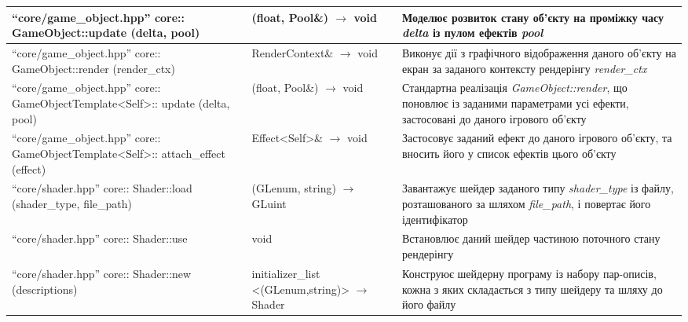 \begin{longtable}{| C{6cm} | C{4cm} | C{5cm} |}
  \hline
  ``core/game_object.hpp'' \newline core:: \newline
  GameObject::update \newline (delta, pool)
  & (float, Pool\&) $\to$ void
  & Моделює розвиток стану об'єкту на проміжку часу
  \emph{delta} із пулом ефектів \emph{pool} \\
  \hline
  ``core/game_object.hpp'' \newline core:: \newline
  GameObject::render \newline (render_ctx)
  & RenderContext\& $\to$ void
  & Виконує дії з графічного відображення даного об'єкту на екран
  за заданого контексту рендерінгу \emph{render_ctx} \\
  \hline
  ``core/game_object.hpp'' \newline core:: \newline
  GameObjectTemplate<Self>:: \newline update \newline (delta, pool)
  & (float, Pool\&) $\to$ void
  & Стандартна реалізація \emph{GameObject::render},
  що поновлює із заданими параметрами усі ефекти,
  застосовані до даного ігрового об'єкту \\
  \hline
  ``core/game_object.hpp'' \newline core:: \newline
  GameObjectTemplate<Self>:: \newline attach_effect \newline (effect)
  & Effect<Self>\& $\to$ void
  & Застосовує заданий ефект до даного ігрового об'єкту,
  та вносить його у список ефектів цього об'єкту \\

  \hline
  ``core/shader.hpp'' \newline core:: \newline
  Shader::load \newline (shader_type, file_path)
  & (GLenum, string) $\to$ GLuint
  & Завантажує шейдер заданого типу \emph{shader_type} із файлу,
  розташованого за шляхом \emph{file_path}, і повертає його ідентифікатор \\
  \hline
  ``core/shader.hpp'' \newline core:: \newline
  Shader::use
  & void
  & Встановлює даний шейдер частиною поточного стану рендерінгу \\
  \hline
  ``core/shader.hpp'' \newline core:: \newline
  Shader::new \newline (descriptions)
  & initializer_list \newline <(GLenum,string)> \newline $\to$ Shader
  & Конструює шейдерну програму із набору пар-описів, кожна з яких
  складається з типу шейдеру та шляху до його файлу \\


\end{longtable}

